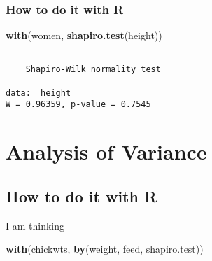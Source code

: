 \documentclass[]{book}
\newenvironment{Shaded}{\begin{snugshade}}{\end{snugshade}}
\newcommand{\KeywordTok}[1]{\textcolor[rgb]{0.13,0.29,0.53}{\textbf{{#1}}}}
\newcommand{\NormalTok}[1]{{#1}}
\numberwithin{equation}{chapter}
\numberwithin{figure}{chapter}
\theoremstyle{plain}
\theoremstyle{definition}
\theoremstyle{remark}
\theoremstyle{definition}
\theoremstyle{definition}
\theoremstyle{remark}
\begin{document}
\subsubsection{How to do it with R}\label{how-to-do-it-with-r-44}

\begin{Shaded}
\begin{Highlighting}[]
\KeywordTok{with}\NormalTok{(women, }\KeywordTok{shapiro.test}\NormalTok{(height))}
\end{Highlighting}
\end{Shaded}

\begin{verbatim}

    Shapiro-Wilk normality test

data:  height
W = 0.96359, p-value = 0.7545
\end{verbatim}

\section{Analysis of Variance}\label{sec-analysis-of-variance}

\subsection{How to do it with R}\label{how-to-do-it-with-r-45}

I am thinking

\begin{Shaded}
\begin{Highlighting}[]
\KeywordTok{with}\NormalTok{(chickwts, }\KeywordTok{by}\NormalTok{(weight, feed, shapiro.test))}
\end{Highlighting}
\end{Shaded}
\end{document}
